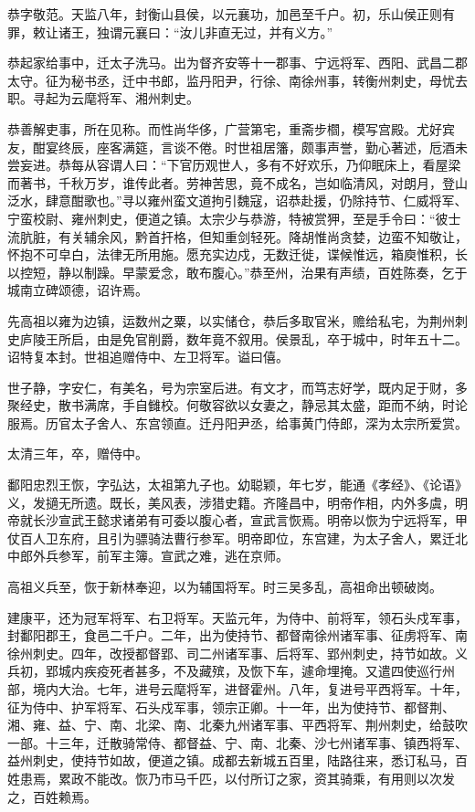 \documentclass[12pt,UTF8]{ctexbook}
\begin{document}
恭字敬范。天监八年，封衡山县侯，以元襄功，加邑至千户。初，乐山侯正则有罪，敕让诸王，独谓元襄曰：“汝儿非直无过，并有义方。”

恭起家给事中，迁太子洗马。出为督齐安等十一郡事、宁远将军、西阳、武昌二郡太守。征为秘书丞，迁中书郎，监丹阳尹，行徐、南徐州事，转衡州刺史，母忧去职。寻起为云麾将军、湘州刺史。

恭善解吏事，所在见称。而性尚华侈，广营第宅，重斋步櫩，模写宫殿。尤好宾友，酣宴终辰，座客满筵，言谈不倦。时世祖居籓，颇事声誉，勤心著述，卮酒未尝妄进。恭每从容谓人曰：“下官历观世人，多有不好欢乐，乃仰眠床上，看屋梁而著书，千秋万岁，谁传此者。劳神苦思，竟不成名，岂如临清风，对朗月，登山泛水，肆意酣歌也。”寻以雍州蛮文道拘引魏寇，诏恭赴援，仍除持节、仁威将军、宁蛮校尉、雍州刺史，便道之镇。太宗少与恭游，特被赏狎，至是手令曰：“彼士流肮脏，有关辅余风，黔首扞格，但知重剑轻死。降胡惟尚贪婪，边蛮不知敬让，怀抱不可皁白，法律无所用施。愿充实边戍，无数迁徙，谍候惟远，箱庾惟积，长以控短，静以制躁。早蒙爱念，敢布腹心。”恭至州，治果有声绩，百姓陈奏，乞于城南立碑颂德，诏许焉。

先高祖以雍为边镇，运数州之粟，以实储仓，恭后多取官米，赡给私宅，为荆州刺史庐陵王所启，由是免官削爵，数年竟不叙用。侯景乱，卒于城中，时年五十二。诏特复本封。世祖追赠侍中、左卫将军。谥曰僖。

世子静，字安仁，有美名，号为宗室后进。有文才，而笃志好学，既内足于财，多聚经史，散书满席，手自雠校。何敬容欲以女妻之，静忌其太盛，距而不纳，时论服焉。历官太子舍人、东宫领直。迁丹阳尹丞，给事黄门侍郎，深为太宗所爱赏。

太清三年，卒，赠侍中。

鄱阳忠烈王恢，字弘达，太祖第九子也。幼聪颖，年七岁，能通《孝经》、《论语》义，发擿无所遗。既长，美风表，涉猎史籍。齐隆昌中，明帝作相，内外多虞，明帝就长沙宣武王懿求诸弟有可委以腹心者，宣武言恢焉。明帝以恢为宁远将军，甲仗百人卫东府，且引为骠骑法曹行参军。明帝即位，东宫建，为太子舍人，累迁北中郎外兵参军，前军主簿。宣武之难，逃在京师。

高祖义兵至，恢于新林奉迎，以为辅国将军。时三吴多乱，高祖命出顿破岗。

建康平，还为冠军将军、右卫将军。天监元年，为侍中、前将军，领石头戍军事，封鄱阳郡王，食邑二千户。二年，出为使持节、都督南徐州诸军事、征虏将军、南徐州刺史。四年，改授都督郢、司二州诸军事、后将军、郢州刺史，持节如故。义兵初，郢城内疾疫死者甚多，不及藏殡，及恢下车，遽命埋掩。又遣四使巡行州部，境内大治。七年，进号云麾将军，进督霍州。八年，复进号平西将军。十年，征为侍中、护军将军、石头戍军事，领宗正卿。十一年，出为使持节、都督荆、湘、雍、益、宁、南、北梁、南、北秦九州诸军事、平西将军、荆州刺史，给鼓吹一部。十三年，迁散骑常侍、都督益、宁、南、北秦、沙七州诸军事、镇西将军、益州刺史，使持节如故，便道之镇。成都去新城五百里，陆路往来，悉订私马，百姓患焉，累政不能改。恢乃市马千匹，以付所订之家，资其骑乘，有用则以次发之，百姓赖焉。
\end{document}
